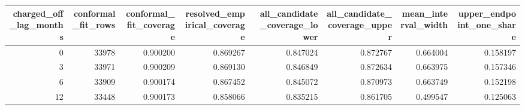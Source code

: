 \begin{tabular}{rrrrrrrr}
\toprule
charged\_off\_lag\_months & conformal\_fit\_rows & conformal\_fit\_coverage & resolved\_empirical\_coverage & all\_candidate\_coverage\_lower & all\_candidate\_coverage\_upper & mean\_interval\_width & upper\_endpoint\_one\_share \\
\midrule
0 & 33978 & 0.900200 & 0.869267 & 0.847024 & 0.872767 & 0.664004 & 0.158197 \\
3 & 33971 & 0.900209 & 0.869130 & 0.846849 & 0.872634 & 0.663975 & 0.157346 \\
6 & 33909 & 0.900174 & 0.867452 & 0.845072 & 0.870973 & 0.663749 & 0.152198 \\
12 & 33448 & 0.900173 & 0.858066 & 0.835215 & 0.861705 & 0.499547 & 0.125063 \\
\bottomrule
\end{tabular}
